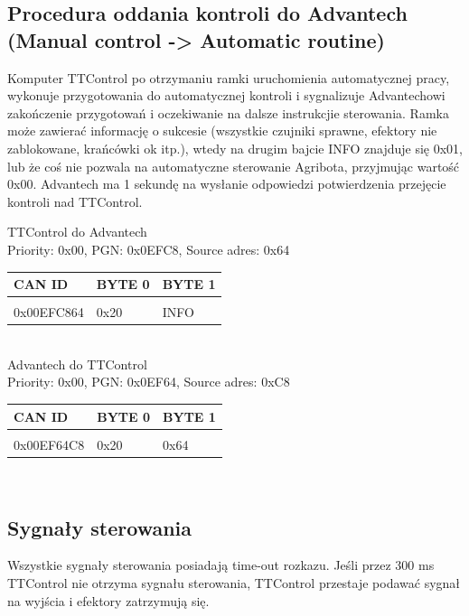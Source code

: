 \documentclass{article}
\begin{document}
\subsection{Procedura oddania kontroli do Advantech (Manual control -> Automatic routine) }

Komputer TTControl po otrzymaniu ramki uruchomienia automatycznej pracy, wykonuje przygotowania do automatycznej kontroli i sygnalizuje Advantechowi zakończenie przygotowań i oczekiwanie na  dalsze instrukcjie sterowania. Ramka może zawierać informację o sukcesie (wszystkie czujniki sprawne, efektory nie zablokowane, krańcówki ok itp.), wtedy na drugim bajcie INFO znajduje się 0x01, lub że coś nie pozwala na automatyczne sterowanie Agribota, przyjmując wartość 0x00. Advantech ma 1 sekundę na wysłanie odpowiedzi potwierdzenia przejęcie kontroli nad TTControl.

TTControl do Advantech\\
Priority: 0x00, PGN: 0x0EFC8, Source adres: 0x64\\
\begin{left}
\begin{tabular}{ |p{2cm}|p{1.5cm}|p{1.5cm}|}  
 \hline
 CAN ID & BYTE 0 & BYTE 1 \\ \hline
 & &\\
 0x00EFC864 & 0x20 & INFO\\ 
 \hline
\end{tabular}
\end{left}\\

Advantech do TTControl\\
Priority: 0x00, PGN: 0x0EF64, Source adres: 0xC8\\
\begin{left}
\begin{tabular}{ |p{2cm}|p{1.5cm}|p{1.5cm}|}   
 \hline
 CAN ID & BYTE 0 & BYTE 1\\ \hline
 & &\\
 0x00EF64C8 & 0x20 & 0x64\\ 
 \hline
\end{tabular}
\end{left}\\


\subsection{Sygnały sterowania}
Wszystkie sygnały sterowania posiadają time-out rozkazu. Jeśli przez 300 ms TTControl nie otrzyma sygnału sterowania, TTControl przestaje podawać sygnał na wyjścia i efektory zatrzymują się. 
\end{document}
